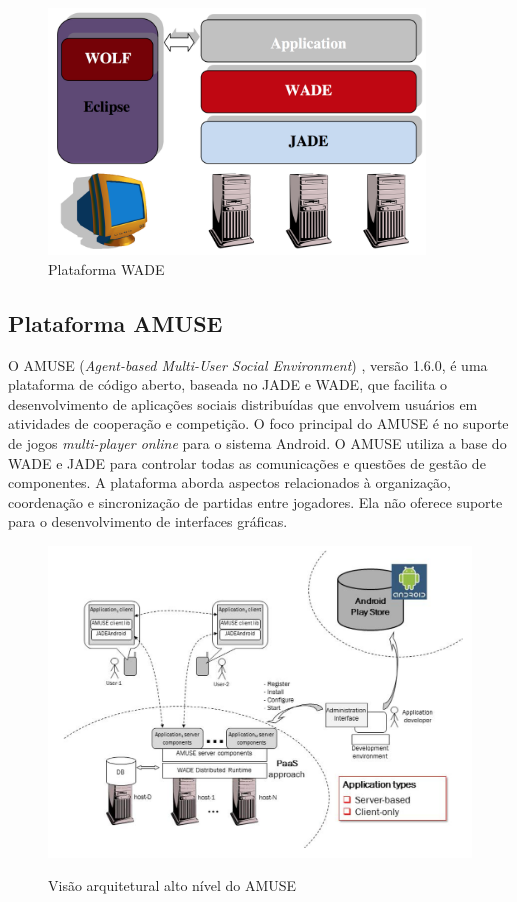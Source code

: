 \begin{figure}[h]
  \centering
  \includegraphics[width=10cm]{figuras/wade}
  \caption{Plataforma WADE \cite{wadeUserGuide}}
  \label{figura:wade}
\end{figure}

    \subsection{Plataforma AMUSE}

O AMUSE (\textit{Agent-based Multi-User Social Environment}) \cite{amuse},
versão 1.6.0, é uma plataforma de código aberto, baseada no JADE e WADE, que
facilita o desenvolvimento de aplicações sociais distribuídas que envolvem
usuários em atividades de cooperação e competição. O foco principal do AMUSE é
no suporte de jogos \textit{multi-player online} para o sistema Android. O
AMUSE utiliza a base do WADE e JADE para controlar todas as comunicações e
questões de gestão de componentes. A plataforma aborda aspectos relacionados à
organização, coordenação e sincronização de partidas entre jogadores. Ela não
oferece suporte para o desenvolvimento de interfaces gráficas.

\begin{figure}[h]
  \centering
  \includegraphics[width=13cm]{figuras/amuse_architecture}
  \caption{Visão arquitetural alto nível do AMUSE}
  \cite{bergenti2015}
  \label{figura:amuse_architecture}
\end{figure}

